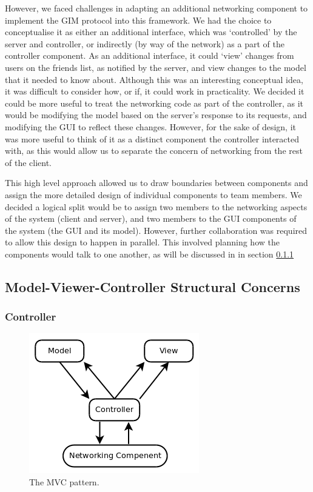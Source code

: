 However, we faced challenges in adapting an additional networking component to implement the GIM protocol into this framework. We had the choice to conceptualise it as either an additional interface, which was `controlled' by the server and controller, or indirectly (by way of the network) as a part of the controller component. As an additional interface, it could `view' changes from users on the friends list, as notified by the server, and view changes to the model that it needed to know about. Although this was an interesting conceptual idea, it was difficult to consider how, or if, it could work in practicality. We decided it could be more useful to treat the networking code as part of the controller, as it would be modifying the model based on the server's response to its requests, and modifying the GUI to reflect these changes. However, for the sake of design, it was more useful to think of it as a distinct component the controller interacted with, as this would allow us to separate the concern of networking from the rest of the client.
	
This high level approach allowed us to draw boundaries between components and assign the more detailed design of individual components to team members. We decided a logical split would be to assign two members to the networking aspects of the system (client and server), and two members to the GUI components of the system (the GUI and its model). However, further collaboration was required to allow this design to happen in parallel. This involved planning how the components would talk to one another, as will be discussed in in section \ref{controller}

\subsection {Model-Viewer-Controller Structural Concerns}

\subsubsection {Controller}
\label{controller}

\begin{figure}
    \begin{center}
        \includegraphics[scale=0.65]{Design/diagrams/mvc.png}
        \caption{The MVC pattern.}
        \label{mvc}
    \end{center}
\end{figure}

